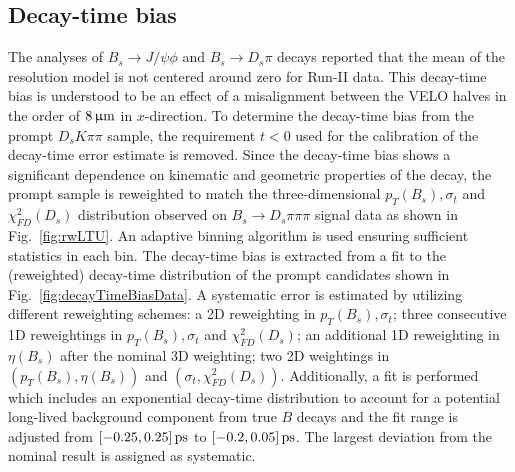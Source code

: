 %
%
%




\clearpage
\subsection{Decay-time bias}
\label{ssec:bias}


The analyses of $B_s \to J/\psi \phi$\cite{Aaij:2019vot} and $B_s \to D_s \pi$\cite{DspiRun2} decays 
reported that the mean of the resolution model is not centered around zero for Run-II data.
This decay-time bias is understood to be an effect of a misalignment
between the VELO halves in the order of $8{\,\upmu\mathrm{m}}$ in $x$-direction.
To determine the decay-time bias from the prompt $D_sK\pi\pi$ sample, the requirement $t<0$ used for the calibration of the decay-time error estimate is removed.
Since the decay-time bias shows a significant dependence on kinematic and geometric properties of the decay, 
the prompt sample is reweighted to match the three-dimensional $p_T(B_s),\sigma_t$ and $\chi^{2}_{FD}(D_s)$
distribution observed on $B_s \to D_s \pi\pi\pi$ signal data as shown in Fig.~\ref{fig:rwLTU}.
An adaptive binning algorithm is used ensuring sufficient statistics in each bin.
The decay-time bias is extracted from a fit to the (reweighted) decay-time distribution of the prompt candidates shown in Fig.~\ref{fig:decayTimeBiasData}.
A systematic error is estimated by utilizing different reweighting schemes: 
a 2D reweighting in $p_T(B_s),\sigma_t$; 
three consecutive 1D reweightings in $p_T(B_s),\sigma_t$ and $\chi^{2}_{FD}(D_s)$;
an additional 1D reweighting in $\eta(B_s)$ after the nominal 3D weighting;
two 2D weightings in $(p_T(B_s), \eta(B_s))$ and $(\sigma_t, \chi^{2}_{FD}(D_s))$.
Additionally, a fit is performed which includes an exponential decay-time distribution to account for a potential long-lived background component from true $B$ decays
and the fit range is adjusted from $[-0.25,0.25]{\mathrm{ \,ps}}$ to $[-0.2,0.05]{\mathrm{ \,ps}}$.
The largest deviation from the nominal result is assigned as systematic.

